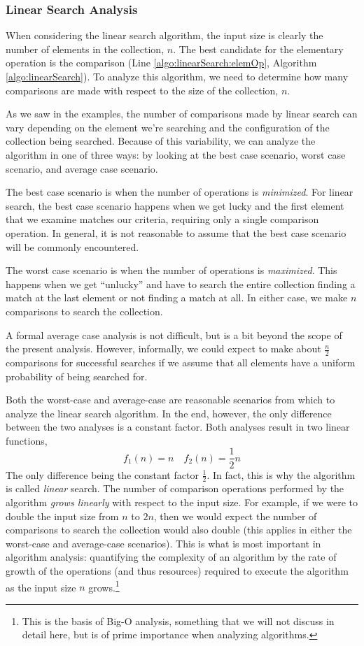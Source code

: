 \subsubsection{Linear Search Analysis}

When considering the linear search algorithm, the input size is clearly the
number of elements in the collection, $n$.  The best candidate for the
elementary operation is the comparison (Line \ref{algo:linearSearch:elemOp}, 
Algorithm \ref{algo:linearSearch}).  To analyze this algorithm, we need
to determine how many comparisons are made with respect to the size of
the collection, $n$.

As we saw in the examples, the number of comparisons made by linear search
can vary depending on the element we're searching and the configuration of
the collection being searched.  Because of this variability, we can 
analyze the algorithm in one of three ways: by looking at the best case
scenario, worst case scenario, and average case scenario.

The best case scenario is when the number of operations is \emph{minimized}.
For linear search, the best case scenario happens when we get lucky and
the first element that we examine matches our criteria, requiring only a 
single comparison operation.  In general, it is not reasonable to assume
that the best case scenario will be commonly encountered.

The worst case scenario is when the number of operations is \emph{maximized}.
This happens when we get ``unlucky'' and have to search the entire collection
finding a match at the last element or not finding a match at all.  In either
case, we make $n$ comparisons to search the collection.

A formal average case analysis is not difficult, but is a bit beyond the
scope of the present analysis.  However, informally, we could expect to make
about $\frac{n}{2}$ comparisons for successful searches if we assume that
all elements have a uniform probability of being searched for.

Both the worst-case and average-case are reasonable scenarios from which to
analyze the linear search algorithm.  In the end, however, the only difference
between the two analyses is a constant factor.  Both analyses result in two
linear functions, 
  $$f_1(n) = n \quad f_2(n) = \frac{1}{2}n$$
The only difference being the constant factor $\frac{1}{2}$.  In fact, this
is why the algorithm is called \emph{linear} search.  The number of comparison
operations performed by the algorithm \emph{grows linearly} with respect
to the input size.  For example, if we were to double the input size from
$n$ to $2n$, then we would expect the number of comparisons to search the
collection would also double (this applies in either the worst-case and average-case
scenarios).  This is what is most important in algorithm analysis: quantifying
the complexity of an algorithm by the rate of growth of the operations (and
thus resources) required to execute the algorithm as the input size $n$ 
grows.\footnote{This is the basis of Big-O analysis, something that 
we will not discuss in detail here, but is of prime importance when analyzing
algorithms.}

